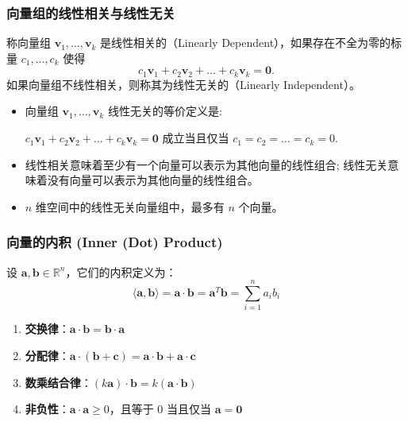 \begin{frame}
\frametitle{向量组的线性相关与线性无关}

\begin{Def}[线性相关与线性无关]
称向量组 $\mathbf{v}_1, \dots, \mathbf{v}_k$ 是线性相关的（Linearly Dependent），如果存在不全为零的标量 $c_1, \dots, c_k$ 使得
\[
c_1 \mathbf{v}_1 + c_2 \mathbf{v}_2 + \dots + c_k \mathbf{v}_k = \mathbf{0}.
\]
如果向量组不线性相关，则称其为线性无关的（Linearly Independent）。
\end{Def}

\vspace{1em}

\begin{remark}
\begin{itemize}
\item 向量组 $\mathbf{v}_1, \dots, \mathbf{v}_k$ 线性无关的等价定义是:

\begin{center}
$c_1 \mathbf{v}_1 + c_2 \mathbf{v}_2 + \dots + c_k \mathbf{v}_k = \mathbf{0}$ 成立当且仅当 $c_1 = c_2 = \dots = c_k = 0.$
\end{center}
\item 线性相关意味着至少有一个向量可以表示为其他向量的线性组合; 线性无关意味着没有向量可以表示为其他向量的线性组合。
\item $n$ 维空间中的线性无关向量组中，最多有 $n$ 个向量。
\end{itemize}
\end{remark}

\end{frame}


\begin{frame}
\frametitle{向量的内积 (Inner (Dot) Product)}

\begin{Def}[向量的内积]
设 $\mathbf{a}, \mathbf{b} \in \mathbb{R}^n$，它们的内积定义为：
\[
\langle \mathbf{a}, \mathbf{b} \rangle = \mathbf{a} \cdot \mathbf{b} = \mathbf{a}^T \mathbf{b} = \sum_{i=1}^n a_i b_i
\]
\end{Def}

\begin{prop}[内积的性质]
\begin{enumerate}
    \item \textbf{交换律}：$\mathbf{a} \cdot \mathbf{b} = \mathbf{b} \cdot \mathbf{a}$
    \item \textbf{分配律}：$\mathbf{a} \cdot (\mathbf{b} + \mathbf{c}) = \mathbf{a} \cdot \mathbf{b} + \mathbf{a} \cdot \mathbf{c}$
    \item \textbf{数乘结合律}：$(k\mathbf{a}) \cdot \mathbf{b} = k(\mathbf{a} \cdot \mathbf{b})$
    \item \textbf{非负性}：$\mathbf{a} \cdot \mathbf{a} \ge 0$，且等于 $0$ 当且仅当 $\mathbf{a} = \mathbf{0}$
\end{enumerate}
\end{prop}

\end{frame}

